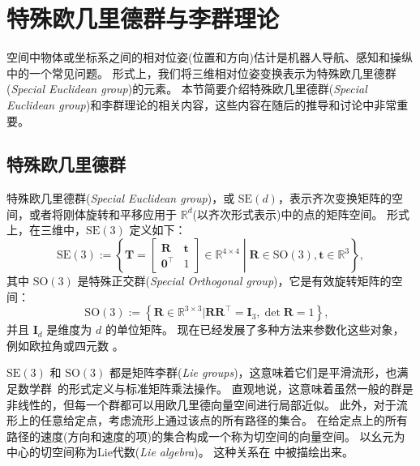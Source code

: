 \section{特殊欧几里德群与李群理论}
\label{sec:SE3}

空间中物体或坐标系之间的相对位姿(位置和方向)估计是机器人导航、感知和操纵中的一个常见问题。 
形式上，我们将三维相对位姿变换表示为特殊欧几里德群(\textit{Special Euclidean group})的元素。 
本节简要介绍特殊欧几里德群(\textit{Special Euclidean group})和李群理论的相关内容，这些内容在随后的推导和讨论中非常重要。  

\subsection{特殊欧几里德群}



特殊欧几里德群(\textit{Special Euclidean group})，或 $\mathrm{SE}(d)$，表示齐次变换矩阵的空间，或者将刚体旋转和平移应用于 $\mathbb{R}^d$(以齐次形式表示)中的点的矩阵空间。 
形式上，在三维中，$\mathrm{SE}(3)$ 定义如下：
\begin{equation}
    \mathrm{SE}(3) := \left\{ \mathbf{T} = \left[ \begin{array}{cc}
        \mathbf{R}~ & \mathbf{t} \\
        \mathbf{0}^\top & 1
    \end{array} \right] \in \mathbb{R}^{4 \times 4} \middle| \mathbf{R} \in \mathrm{SO}(3), \mathbf{t} \in \mathbb{R}^3\right\},
\end{equation}
其中 $\mathrm{SO}(3)$ 是特殊正交群(\textit{Special Orthogonal group})，它是有效旋转矩阵的空间： 
\begin{equation}
    \mathrm{SO}(3) := \left\{ \mathbf{R} \in \mathbb{R}^{3 \times 3} | \mathbf{R}\mathbf{R}^\top = \mathbf{I}_3, \operatorname{det}\mathbf{R} = 1 \right\},~~~
\end{equation}
并且 $\mathbf{I}_d$ 是维度为 $d$ 的单位矩阵。 
现在已经发展了多种方法来参数化这些对象，例如欧拉角或四元数 \cite{spong2005robot}。  

$\mathrm{SE}(3)$ 和 $\mathrm{SO}(3)$ 都是矩阵李群(\textit{Lie groups})，这意味着它们是平滑流形，也满足数学群~\cite{tapp2016matrix,baker2012matrix}的形式定义与标准矩阵乘法操作。 
直观地说，这意味着虽然一般的群是非线性的，但每一个群都可以用欧几里德向量空间进行局部近似。 
此外，对于流形上的任意给定点，考虑流形上通过该点的所有路径的集合。 
在给定点上的所有路径的速度(方向和速度的项)的集合构成一个称为切空间的向量空间。 
以幺元为中心的切空间称为Lie代数(\textit{Lie algebra})。 
这种关系在  中被描绘出来。 

